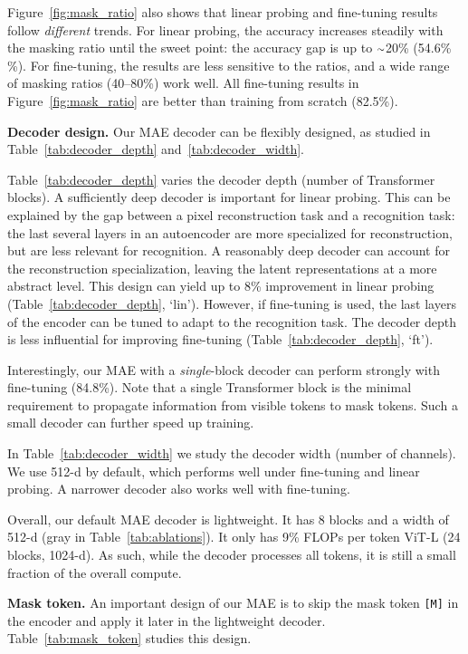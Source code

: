 Figure~\ref{fig:mask_ratio} also shows that linear probing and fine-tuning results follow \textit{different} trends. For linear probing, the accuracy increases steadily with the masking ratio until the sweet point: the accuracy gap is up to $\raise.17ex\hbox{$\scriptstyle\sim$}$20\% (54.6\% \%). For fine-tuning, the results are less sensitive to the ratios, and a wide range of masking ratios (40--80\%) work well. All fine-tuning results in Figure~\ref{fig:mask_ratio} are better than training from scratch (82.5\%).

\textbf{Decoder design.} Our MAE decoder can be flexibly designed, as studied in Table~\ref{tab:decoder_depth} and~\ref{tab:decoder_width}.

Table~\ref{tab:decoder_depth} varies the decoder depth (number of Transformer blocks). A sufficiently deep decoder is important for linear probing. This can be explained by the gap between a pixel reconstruction task and a recognition task: the last several layers in an autoencoder are more specialized for reconstruction, but are less relevant for recognition. A reasonably deep decoder can account for the reconstruction specialization, leaving the latent representations at a more abstract level. This design can yield up to 8\% improvement in linear probing (Table~\ref{tab:decoder_depth}, `lin'). However, if fine-tuning is used, the last layers of the encoder can be tuned to adapt to the recognition task. The decoder depth is less influential for improving fine-tuning (Table~\ref{tab:decoder_depth}, `ft').

Interestingly, our MAE with a \textit{single}-block decoder can perform strongly with fine-tuning (84.8\%). Note that a single Transformer block is the minimal requirement to propagate information from visible tokens to mask tokens. Such a small decoder can further speed up training.

In Table~\ref{tab:decoder_width} we study the decoder width (number of channels). We use 512-d by default, which performs well under fine-tuning and linear probing. A narrower decoder also works well with fine-tuning.

Overall, our default MAE decoder is lightweight. It has 8 blocks and a width of 512-d (\colorbox{baselinecolor}{gray} in Table~\ref{tab:ablations}). It only has 9\% FLOPs per token \vs ViT-L (24 blocks, 1024-d). As such, while the decoder processes all tokens, it is still a small fraction of the overall compute.

\textbf{Mask token.} An important design of our MAE is to skip the mask token \texttt{[M]} in the encoder and apply it later in the lightweight decoder. Table~\ref{tab:mask_token} studies this design.

